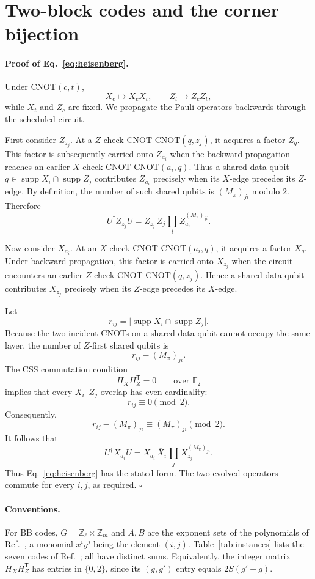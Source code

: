 \documentclass[reprint,twocolumn,superscriptaddress,nofootinbib]{revtex4-2}
\theoremstyle{plain}
\newcommand{\F}{\mathbb{F}_2}
\begin{document}
\section{Two-block codes and the corner bijection}
\label{si:corners}

\paragraph*{Proof of Eq.~\eqref{eq:heisenberg}.}
Under $\mathrm{CNOT}(c,t)$,
\[
X_c\mapsto X_cX_t,
\qquad
Z_t\mapsto Z_cZ_t,
\]
while $X_t$ and $Z_c$ are fixed. We propagate the Pauli operators
backwards through the scheduled circuit.

First consider $Z_{z_j}$. At a $Z$-check CNOT
$\mathrm{CNOT}(q,z_j)$, it acquires a factor $Z_q$. This factor is
subsequently carried onto $Z_{a_i}$ when the backward propagation reaches
an earlier $X$-check CNOT $\mathrm{CNOT}(a_i,q)$. Thus a shared data qubit
$q\in\operatorname{supp}X_i\cap\operatorname{supp}Z_j$ contributes
$Z_{a_i}$ precisely when its $X$-edge precedes its $Z$-edge. By
definition, the number of such shared qubits is $(M_\pi)_{ji}$ modulo
$2$. Therefore
\[
U^\dagger Z_{z_j}U
=
Z_{z_j}\,\overline{Z}_j
\prod_i Z_{a_i}^{(M_\pi)_{ji}}.
\]

Now consider $X_{a_i}$. At an $X$-check CNOT
$\mathrm{CNOT}(a_i,q)$, it acquires a factor $X_q$. Under backward
propagation, this factor is carried onto $X_{z_j}$ when the circuit
encounters an earlier $Z$-check CNOT $\mathrm{CNOT}(q,z_j)$. Hence a
shared data qubit contributes $X_{z_j}$ precisely when its $Z$-edge
precedes its $X$-edge.

Let
\[
r_{ij}
=
\bigl|
\operatorname{supp}X_i
\cap
\operatorname{supp}Z_j
\bigr|.
\]
Because the two incident CNOTs on a shared data qubit cannot occupy the
same layer, the number of $Z$-first shared qubits is
\[
r_{ij}-(M_\pi)_{ji}.
\]
The CSS commutation condition
\[
H_XH_Z^{\mathsf T}=0
\qquad\text{over }\F
\]
implies that every $X_i$--$Z_j$ overlap has even cardinality:
\[
r_{ij}\equiv0\pmod2.
\]
Consequently,
\[
r_{ij}-(M_\pi)_{ji}
\equiv
(M_\pi)_{ji}
\pmod2.
\]
It follows that
\[
U^\dagger X_{a_i}U
=
X_{a_i}\,\overline{X}_i
\prod_j X_{z_j}^{(M_\pi)_{ji}}.
\]
Thus Eq.~\eqref{eq:heisenberg} has the stated form. The two evolved
operators commute for every $i,j$, as required. \hfill$\square$

\paragraph*{Conventions.}
For BB codes, $G=\mathbb{Z}_\ell\times\mathbb{Z}_m$ and $A,B$ are the
exponent sets of the polynomials of Ref.~\cite{Bravyi2024}, a monomial
$x^iy^j$ being the element $(i,j)$. Table~\ref{tab:instances} lists the
seven codes of Ref.~\cite{Bravyi2024}; all have distinct sums.
Equivalently, the integer matrix $H_XH_Z^{\mathsf T}$ has entries in
$\{0,2\}$, since its $(g,g')$ entry equals $2S(g'-g)$.
\end{document}

